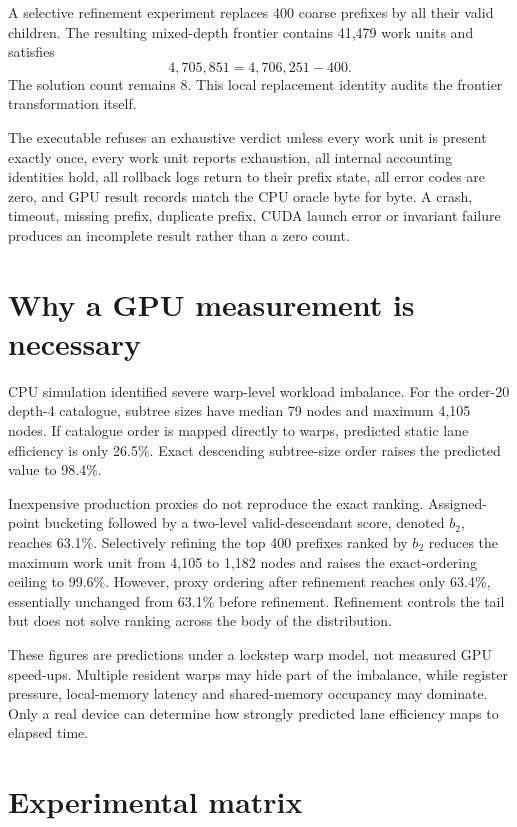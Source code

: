 \documentclass[11pt,a4paper]{article}
\begin{document}
A selective refinement experiment replaces 400 coarse prefixes by all their valid children. The resulting mixed-depth frontier contains 41,479 work units and satisfies
\[
4,705,851=4,706,251-400.
\]
The solution count remains 8. This local replacement identity audits the frontier transformation itself.

The executable refuses an exhaustive verdict unless every work unit is present exactly once, every work unit reports exhaustion, all internal accounting identities hold, all rollback logs return to their prefix state, all error codes are zero, and GPU result records match the CPU oracle byte for byte. A crash, timeout, missing prefix, duplicate prefix, CUDA launch error or invariant failure produces an incomplete result rather than a zero count.

\section{Why a GPU measurement is necessary}

CPU simulation identified severe warp-level workload imbalance. For the order-20 depth-4 catalogue, subtree sizes have median 79 nodes and maximum 4,105 nodes. If catalogue order is mapped directly to warps, predicted static lane efficiency is only 26.5\%. Exact descending subtree-size order raises the predicted value to 98.4\%.

Inexpensive production proxies do not reproduce the exact ranking. Assigned-point bucketing followed by a two-level valid-descendant score, denoted $b_2$, reaches 63.1\%. Selectively refining the top 400 prefixes ranked by $b_2$ reduces the maximum work unit from 4,105 to 1,182 nodes and raises the exact-ordering ceiling to 99.6\%. However, proxy ordering after refinement reaches only 63.4\%, essentially unchanged from 63.1\% before refinement. Refinement controls the tail but does not solve ranking across the body of the distribution.

These figures are predictions under a lockstep warp model, not measured GPU speed-ups. Multiple resident warps may hide part of the imbalance, while register pressure, local-memory latency and shared-memory occupancy may dominate. Only a real device can determine how strongly predicted lane efficiency maps to elapsed time.

\section{Experimental matrix}
\end{document}
